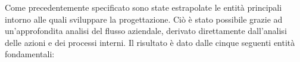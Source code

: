 Come precedentemente specificato sono state estrapolate le entità principali intorno alle quali sviluppare la progettazione. Ciò è stato possibile grazie ad un'approfondita analisi del flusso aziendale, derivato direttamente dall'analisi delle azioni e dei processi interni.\newline
Il risultato è dato dalle cinque seguenti entità fondamentali: \newline

\noindent{}






%
%
%
%
%
%
%

\newpage
